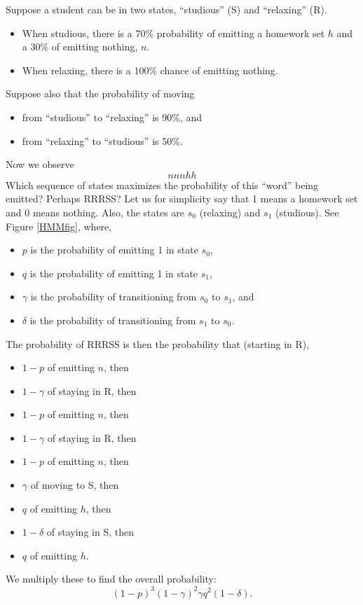 	Suppose a student can be in two states, ``studious'' (S) and ``relaxing'' (R).
	\begin{itemize}
	\item When studious, there is a 70\% probability of emitting a homework set $h$ and a 30\% of emitting nothing, $n$.
	\item When relaxing, there is a 100\% chance of emitting nothing.
	\end{itemize}
	Suppose also that the probability of moving 
	\begin{itemize}
	\item from ``studious'' to ``relaxing'' is 90\%, and
	\item from ``relaxing'' to ``studious'' is 50\%.
	\end{itemize}
	Now we observe
	\[
		nnnhh
	\]
	Which sequence of states maximizes the probability of this ``word'' being emitted?
	Perhaps RRRSS?
	Let us for simplicity say that 1 means a homework set and 0 means nothing.
	Also, the states are $s_0$ (relaxing) and $s_1$ (studious).
	See Figure \ref{HMMfig}, where,
	\begin{itemize}
		\item $p$ is the probability of emitting 1 in state $s_0$,
		\item $q$ is the probability of emitting 1 in state $s_1$,
		\item $\gamma$ is the probability of transitioning from $s_0$ to $s_1$, and
		\item $\delta$ is the probability of transitioning from $s_1$ to $s_0$.
	\end{itemize}
	The probability of RRRSS is then the probability that (starting in R),
	\begin{itemize}
		\item $1-p$ of emitting $n$, then
		\item $1-\gamma$ of staying in R, then
		\item $1-p$ of emitting $n$, then
		\item $1-\gamma$ of staying in R, then
		\item $1-p$ of emitting $n$, then
		\item $\gamma$ of moving to S, then
		\item $q$ of emitting $h$, then
		\item $1-\delta$ of staying in S, then
		\item $q$ of emitting $h$.
	\end{itemize}
	We multiply these to find the overall probability:
	\begin{equation}\label{thanksDanielT}
		(1-p)^3(1-\gamma)^2\gamma q^2(1-\delta).
	\end{equation}
